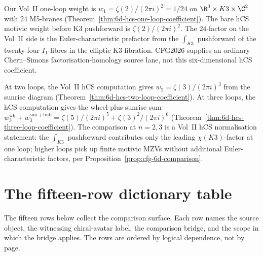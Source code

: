 \begin{remark}
\label{rem:cfg-feynman-one-loop}
Our Vol~II one-loop weight is
$w_1 = \zeta(2)/(2\pi i)^2 = 1/24$ on
$\R^3\times K3\times\C^2$ with $24$ M5-branes
(Theorem~\ref{thm:6d-hcs-one-loop-coefficient}). The bare hCS motivic
weight before K3 pushforward is $\zeta(2)/(2\pi i)^2$. The $24$-factor
on the Vol~II side is the Euler-characteristic prefactor from the
$\int_{K3}$ pushforward of the twenty-four $I_1$-fibres in the elliptic
K3 fibration. CFG2026 supplies an ordinary Chern--Simons
factorisation-homology source lane, not this six-dimensional hCS
coefficient.
\end{remark}

\begin{remark}
\label{rem:cfg-feynman-higher-loop}
At two loops, the Vol~II hCS computation gives
$w_2 = \zeta(3)/(2\pi i)^3$ from the sunrise diagram
(Theorem~\ref{thm:6d-hcs-two-loop-coefficient}). At three loops, the
hCS computation gives the wheel-plus-sunrise sum
$w_3^{\mathrm{wh}} + w_3^{\mathrm{sun+bub}}
= \zeta(5)/(2\pi i)^5 + \zeta(3)^2/(2\pi i)^6$
(Theorem~\ref{thm:6d-hcs-three-loop-coefficient}). The comparison at
$n = 2,3$ is a Vol~II hCS normalisation statement: the
$\int_{K3}$ pushforward contributes only the leading
$\chi(K3)$-factor at one loop; higher loops pick up finite motivic
MZVs without additional Euler-characteristic factors, per
Proposition~\ref{prop:cfg-6d-comparison}.
\end{remark}

\section{The fifteen-row dictionary table}
\label{sec:cfg-fifteen-row-table}

The fifteen rows below collect the comparison surface. Each row names
the source object, the witnessing chiral-avatar label, the comparison
bridge, and the scope in which the bridge applies. The rows are ordered
by logical dependence, not by page.

